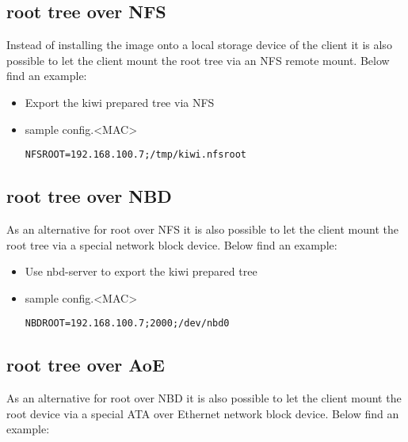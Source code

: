 \subsection{root tree over NFS}

Instead of installing the image onto a local storage device of
the client it is also possible to let the client mount the root
tree via an NFS remote mount. Below find an example:

\begin{itemize}
\item Export the kiwi prepared tree via NFS
\item sample config.<MAC>

\begin{Command}{12cm}
\begin{verbatim}
NFSROOT=192.168.100.7;/tmp/kiwi.nfsroot
\end{verbatim}
\end{Command}
\end{itemize}

\subsection{root tree over NBD}

As an alternative for root over NFS it is also possible to
let the client mount the root tree via a special network block
device. Below find an example:

\begin{itemize}
\item Use nbd-server to export the kiwi prepared tree
\item sample config.<MAC>

\begin{Command}{12cm}
\begin{verbatim}
NBDROOT=192.168.100.7;2000;/dev/nbd0
\end{verbatim}
\end{Command}
\end{itemize}

\subsection{root tree over AoE}

As an alternative for root over NBD it is also possible to
let the client mount the root device via a special ATA over
Ethernet network block device. Below find an example:

